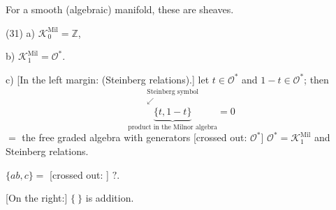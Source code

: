 For a smooth (algebraic) manifold, these are sheaves.

(31) a) $\mathcal K_0^{\mathrm{Mil}}=\mathbb Z$,

b) $\mathcal K_1^{\mathrm{Mil}}=\mathcal O^*$.

c) [In the left margin: (Steinberg relations).]
let $t\in\mathcal O^*$ and $1-t\in\mathcal O^*$; then
\begin{equation*}
\overset{\substack{\text{Steinberg symbol}\\\swarrow}}
{\underbrace{\{t,1-t\}}_{\text{product in the Milnor algebra}}}=0
\end{equation*}
$=$ the free graded algebra with generators
[crossed out: $\mathcal O^*$]
$\mathcal O^*=\mathcal K_1^{\mathrm{Mil}}$ and Steinberg relations.

$\{ab,c\}=$ [crossed out:
]
$?$.

[On the right:] $\{\ \}$ is addition.


